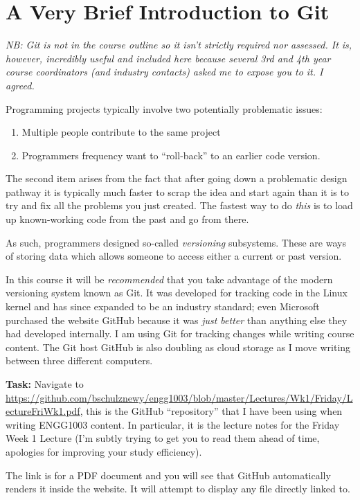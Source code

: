 \documentclass{lab}
\begin{document}
\pagebreak
\section{A Very Brief Introduction to Git}

\textit{NB: Git is not in the course outline so it isn't strictly required nor assessed. It is, however, incredibly useful and included here because several 3rd and 4th year course coordinators (and industry contacts) asked me to expose you to it. I agreed.}

Programming projects typically involve two potentially problematic issues:

\begin{enumerate}
	\item Multiple people contribute to the same project
	\item Programmers frequency want to ``roll-back'' to an earlier code version.
\end{enumerate}

The second item arises from the fact that after going down a problematic design pathway it is typically much faster to scrap the idea and start again than it is to try and fix all the problems you just created. The fastest way to do \textit{this} is to load up known-working code from the past and go from there.

As such, programmers designed so-called \textit{versioning} subsystems. These are ways of storing data which allows someone to access either a current or past version.

In this course it will be \textit{recommended} that you take advantage of the modern versioning system known as Git. It was developed for tracking code in the Linux kernel and has since expanded to be an industry standard; even Microsoft purchased the website GitHub because it was \textit{just better} than anything else they had developed internally. I am using Git for tracking changes while writing course content. The Git host GitHub is also doubling as cloud storage as I move writing between three different computers.

\textbf{Task:} Navigate to \url{https://github.com/bschulznewy/engg1003/blob/master/Lectures/Wk1/Friday/LectureFriWk1.pdf}, this is the GitHub ``repository'' that I have been using when writing ENGG1003 content. In particular, it is the lecture notes for the Friday Week 1 Lecture (I'm subtly trying to get you to read them ahead of time, apologies for improving your study efficiency).

The link is for a PDF document and you will see that GitHub automatically renders it inside the website. It will attempt to display any file directly linked to.
\end{document}
